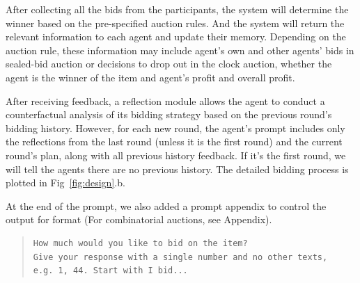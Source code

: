 \documentclass{article} %
\begin{document}
After collecting all the bids from the participants, the system will determine the winner based on the pre-specified auction rules. And the system will return the relevant information to each agent and update their memory. Depending on the auction rule, these information may include agent's own and other agents' bids in sealed-bid auction or decisions to drop out in the clock auction, whether the agent is the winner of the item and agent's profit and overall profit.

After receiving feedback, a reflection module allows the agent to conduct a counterfactual analysis of its bidding strategy based on the previous round's bidding history.
However, for each new round, the agent's prompt includes only the reflections from the last round (unless it is the first round) and the current round's plan, along with all previous history feedback. If it's the first round, we will tell the agents there are no previous history. The detailed bidding process is plotted in Fig~\ref{fig:design}.b.

At the end of the prompt, we also added a prompt appendix to control the output for format (For combinatorial auctions, see Appendix).

\begin{quote}
\begin{lstlisting}[basicstyle=\ttfamily]
How much would you like to bid on the item? 
Give your response with a single number and no other texts,
e.g. 1, 44. Start with I bid...
\end{lstlisting}
\end{quote}




\end{document}
